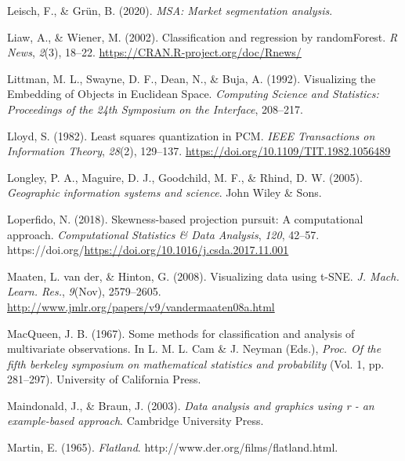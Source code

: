 \documentclass[
  letterpaper,
]{krantz}
\newlength{\cslhangindent}
\newlength{\cslentryspacingunit} %
\newenvironment{CSLReferences}[2] %
 {%
  \setlength{\parindent}{0pt}
  \ifodd #1
  \let\oldpar\par
  \def\par{\hangindent=\cslhangindent\oldpar}
  \fi
  \setlength{\parskip}{#2\cslentryspacingunit}
 }%
 {}
\begin{document}
\begin{CSLReferences}{1}{0}
\leavevmode{}%
Leisch, F., \& Grün, B. (2020). \emph{MSA: Market segmentation
analysis}.

\leavevmode{}%
Liaw, A., \& Wiener, M. (2002). Classification and regression by
randomForest. \emph{R News}, \emph{2}(3), 18--22.
\url{https://CRAN.R-project.org/doc/Rnews/}

\leavevmode{}%
Littman, M. L., Swayne, D. F., Dean, N., \& Buja, A. (1992). Visualizing
the {E}mbedding of {O}bjects in {E}uclidean {S}pace. \emph{Computing
Science and Statistics: Proceedings of the 24th Symposium on the
Interface}, 208--217.

\leavevmode{}%
Lloyd, S. (1982). Least squares quantization in PCM. \emph{IEEE
Transactions on Information Theory}, \emph{28}(2), 129--137.
\url{https://doi.org/10.1109/TIT.1982.1056489}

\leavevmode{}%
Longley, P. A., Maguire, D. J., Goodchild, M. F., \& Rhind, D. W.
(2005). \emph{Geographic information systems and science}. John Wiley \&
Sons.

\leavevmode{}%
Loperfido, N. (2018). Skewness-based projection pursuit: A computational
approach. \emph{Computational Statistics \& Data Analysis}, \emph{120},
42--57. https://doi.org/\url{https://doi.org/10.1016/j.csda.2017.11.001}

\leavevmode{}%
Maaten, L. van der, \& Hinton, G. (2008). Visualizing data using
{t-SNE}. \emph{J. Mach. Learn. Res.}, \emph{9}(Nov), 2579--2605.
\url{http://www.jmlr.org/papers/v9/vandermaaten08a.html}

\leavevmode{}%
MacQueen, J. B. (1967). Some methods for classification and analysis of
multivariate observations. In L. M. L. Cam \& J. Neyman (Eds.),
\emph{Proc. Of the fifth berkeley symposium on mathematical statistics
and probability} (Vol. 1, pp. 281--297). University of California Press.

\leavevmode{}%
Maindonald, J., \& Braun, J. (2003). \emph{Data analysis and graphics
using r - an example-based approach}. Cambridge University Press.

\leavevmode{}%
Martin, E. (1965). \emph{Flatland}.
http://www.der.org/films/flatland.html.


\end{CSLReferences}
\end{document}
